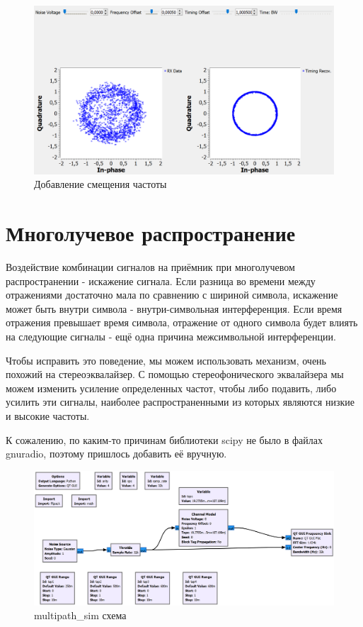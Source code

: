 \documentclass[a4paper,12pt]{report}
\begin{document}
\begin{figure}[H]
        \centering
        \includegraphics[width=1.0\textwidth]{19.png}
        \caption{Добавление смещения частоты}
        \label{fig:lab12_fig3_13}
\end{figure}

\chapter{Многолучевое распространение}

Воздействие комбинации сигналов на приёмник при многолучевом распространении - искажение сигнала. Если разница во времени между отражениями достаточно мала по сравнению с шириной символа, искажение может быть внутри символа - внутри-символьная интерференция. Если время отражения превышает время символа, отражение от одного символа будет влиять на следующие сигналы - ещё одна причина межсимвольной интерференции.

Чтобы исправить это поведение, мы можем использовать механизм, очень похожий на стереоэквалайзер. С помощью стереофонического эквалайзера мы можем изменить усиление определенных частот, чтобы либо подавить, либо усилить эти сигналы, наиболее распространенными из которых являются низкие и высокие частоты.

К сожалению, по каким-то причинам библиотеки scipy не было в файлах gnuradio, поэтому пришлось добавить её вручную.

\begin{figure}[H]
        \centering
        \includegraphics[width=1.0\textwidth]{20.png}
        \caption{multipath\_sim схема}
        \label{fig:lab12_fig4_1}
\end{figure}
\end{document}
